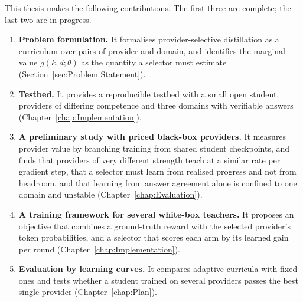 This thesis makes the following contributions. The first three are complete; the last
two are in progress.

\begin{enumerate}[itemsep=2pt,topsep=4pt]
  \item \textbf{Problem formulation.} It formalises provider-selective distillation as
    a curriculum over pairs of provider and domain, and identifies the marginal value
    $g(k, d; \theta)$ as the quantity a selector must estimate
    (Section~\ref{sec:Problem Statement}).
  \item \textbf{Testbed.} It provides a reproducible testbed with a small open student,
    providers of differing competence and three domains with verifiable answers
    (Chapter~\ref{chap:Implementation}).
  \item \textbf{A preliminary study with priced black-box providers.} It measures
    provider value by branching training from shared student checkpoints, and finds
    that providers of very different strength teach at a similar rate per gradient
    step, that a selector must learn from realised progress and not from headroom, and
    that learning from answer agreement alone is confined to one domain and unstable
    (Chapter~\ref{chap:Evaluation}).
  \item \textbf{A training framework for several white-box teachers.} It proposes an
    objective that combines a ground-truth reward with the selected provider's token
    probabilities, and a selector that scores each arm by its learned gain per round
    (Chapter~\ref{chap:Implementation}).
  \item \textbf{Evaluation by learning curves.} It compares adaptive curricula with
    fixed ones and tests whether a student trained on several providers passes the best
    single provider (Chapter~\ref{chap:Plan}).
\end{enumerate}

